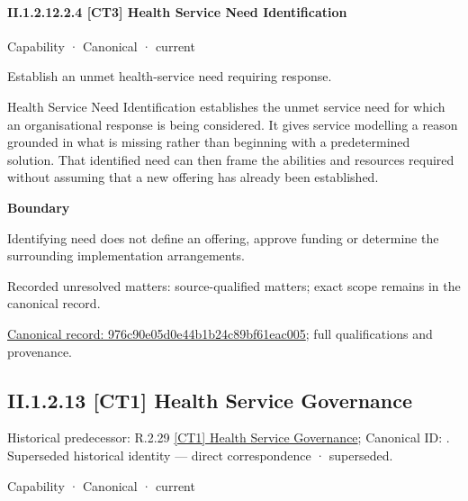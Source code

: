 \paragraph*{II.1.2.12.2.4 [CT3] Health Service Need Identification}
\label{navigation:II.1.2.12.2.4}

\label{element:976c90e05d0e44b1b24c89bf61eac005}
{\small Capability · Canonical · current}\par

Establish an unmet health-service need requiring response.



Health Service Need Identification establishes the unmet service need for which an organisational response is being considered. It gives service modelling a reason grounded in what is missing rather than beginning with a predetermined solution. That identified need can then frame the abilities and resources required without assuming that a new offering has already been established.



\textbf{Boundary}



Identifying need does not define an offering, approve funding or determine the surrounding implementation arrangements.


{\small Recorded unresolved matters: source-qualified matters; exact scope remains in the canonical record.}\par
{\footnotesize \href{../../../../../../../continuum/strategy/capability/976c90e05d0e44b1b24c89bf61eac005.md}{Canonical record: 976c90e05d0e44b1b24c89bf61eac005}; full qualifications and provenance.}\par
\subsection*{II.1.2.13 [CT1] Health Service Governance}
\label{navigation:II.1.2.13}

{\small Historical predecessor: R.2.29 \hyperref[element:24f3dd30223142efa35a5826552d53ab]{[CT1] Health Service Governance}; Canonical ID: \texttt{}. Superseded historical identity — direct correspondence · superseded.}\par
\label{element:209aada781e844e28202a2535a264c21}
{\small Capability · Canonical · current}\par

